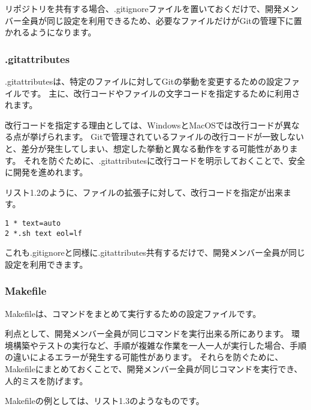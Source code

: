 リポジトリを共有する場合、.gitignoreファイルを置いておくだけで、開発メンバー全員が同じ設定を利用できるため、必要なファイルだけがGitの管理下に置かれるようになります。

\subsubsection{.gitattributes}

.gitattributesは、特定のファイルに対してGitの挙動を変更するための設定ファイルです。
主に、改行コードやファイルの文字コードを指定するために利用されます。

改行コードを指定する理由としては、WindowsとMacOSでは改行コードが異なる点が挙げられます。
Gitで管理されているファイルの改行コードが一致しないと、差分が発生してしまい、想定した挙動と異なる動作をする可能性があります。
それを防ぐために、.gitattributesに改行コードを明示しておくことで、安全に開発を進めれます。

リスト1.2のように、ファイルの拡張子に対して、改行コードを指定が出来ます。

\begin{tcolorbox}[title=リスト1.2 .gitattributes]
  \begin{verbatim}
1 * text=auto
2 *.sh text eol=lf
\end{verbatim}
\end{tcolorbox}

これも.gitignoreと同様に.gitattributes共有するだけで、開発メンバー全員が同じ設定を利用できます。


\subsubsection{Makefile}

Makefileは、コマンドをまとめて実行するための設定ファイルです。

利点として、開発メンバー全員が同じコマンドを実行出来る所にあります。
環境構築やテストの実行など、手順が複雑な作業を一人一人が実行した場合、手順の違いによるエラーが発生する可能性があります。
それらを防ぐために、Makefileにまとめておくことで、開発メンバー全員が同じコマンドを実行でき、人的ミスを防げます。

Makefileの例としては、リスト1.3のようなものです。

